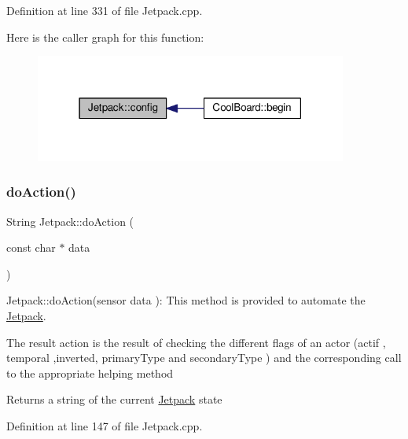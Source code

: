 Definition at line 331 of file Jetpack.\+cpp.

Here is the caller graph for this function\+:\nopagebreak
\begin{figure}[H]
\begin{center}
\leavevmode
\includegraphics[width=291pt]{class_jetpack_ab065ee83e244265a2223a22f3ee4a719_icgraph}
\end{center}
\end{figure}
\mbox{\label{class_jetpack_af9acedb606340c26c2636c282b54dff1}} 
\subsubsection{\texorpdfstring{do\+Action()}{doAction()}}
{\footnotesize\ttfamily String Jetpack\+::do\+Action (\begin{DoxyParamCaption}\item[{const char $\ast$}]{data }\end{DoxyParamCaption})}

Jetpack\+::do\+Action(sensor data )\+: This method is provided to automate the \hyperlink{class_jetpack}{Jetpack}.

The result action is the result of checking the different flags of an actor (actif , temporal ,inverted, primary\+Type and secondary\+Type ) and the corresponding call to the appropriate helping method

\begin{DoxyReturn}{Returns}
a string of the current \hyperlink{class_jetpack}{Jetpack} state 
\end{DoxyReturn}


Definition at line 147 of file Jetpack.\+cpp.

